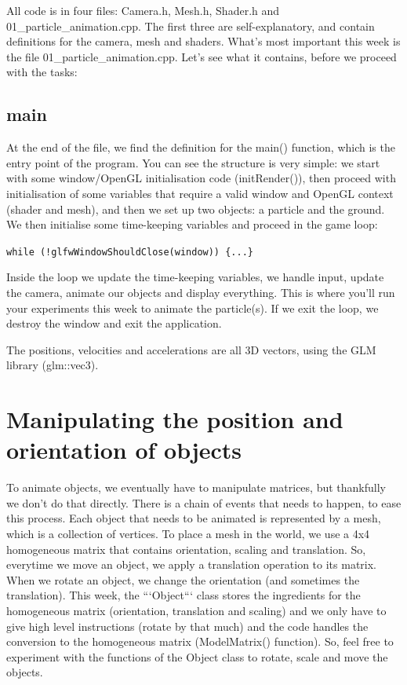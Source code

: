 \documentclass[12pt]{article}
\begin{document}
All code is in four files: Camera.h, Mesh.h, Shader.h and 01\_particle\_animation.cpp. The first three are self-explanatory, and contain definitions for the camera, mesh and shaders. What's most important this week is the file 01\_particle\_animation.cpp. Let's see what it contains, before we proceed with the tasks:

\subsection*{main}

At the end of the file, we find the definition for the main() function, which is the entry point of the program. You can see the structure is very simple: we start with some window/OpenGL initialisation code (initRender()), then proceed with initialisation of some variables that require a valid window and OpenGL context (shader and mesh), and then we set up two objects: a particle and the ground. We then initialise some time-keeping variables and proceed in the game loop: 

\begin{center}
\texttt{while (!glfwWindowShouldClose(window)) \{...\}}
\end{center}

Inside the loop we update the time-keeping variables, we handle input, update the camera, animate our objects and display everything. This is where you'll run your experiments this week to animate the particle(s). If we exit the loop, we destroy the window and exit the application.

The positions, velocities and accelerations are all 3D vectors, using the GLM library (glm::vec3).

\section*{Manipulating the position and orientation of objects}

To animate objects, we eventually have to manipulate matrices, but thankfully we don't do that directly. There is a chain of events that needs to happen, to ease this process. Each object that needs to be animated is represented by a mesh, which is a collection of vertices. To place a mesh in the world, we use a 4x4 homogeneous matrix that contains orientation, scaling and translation. So, everytime we move an object, we apply a translation operation to its matrix. When we rotate an object, we change the orientation (and sometimes the translation). This week, the ```Object``` class stores the ingredients for the homogeneous matrix (orientation, translation and scaling) and we only have to give high level instructions (rotate by that much) and the code handles the conversion to the homogeneous matrix (ModelMatrix() function). So, feel free to experiment with the functions of the Object class to rotate, scale and move the objects.
\end{document}
